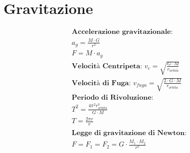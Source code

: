 \section{Gravitazione}

\begin{gather*}
    \textbf{Accelerazione gravitazionale: } \\ a_g = \frac{M\cdot G}{r^2} \\
    F = M \cdot a_g \\
    \textbf{Velocità Centripeta: } v_c= \sqrt{\frac{G \cdot M}{r_{orbita}}} \\
    \textbf{Velocità di Fuga: } v_{fuga}=\sqrt{\frac{2 \cdot G \cdot M}{r_{orbita}}} \\
    \textbf{Periodo di Rivoluzione}: \\ T^2 = \frac{4 \pi^2 r^3_{orbita}}{G \cdot M} \\ T = \frac{2 \pi r}{v_{}}\\
    \textbf{Legge di gravitazione di Newton}: \\ F=F_1=F_2 = G\cdot\frac{M_1\cdot M_2}{r^2}
\end{gather*}

